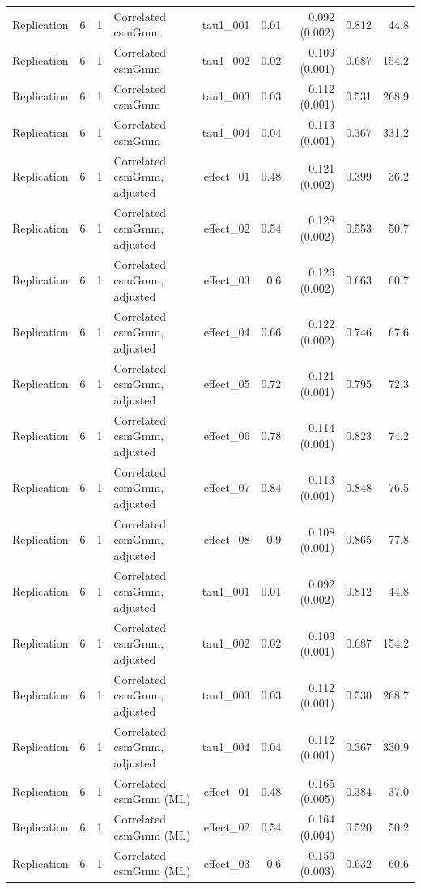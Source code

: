 \begin{longtable}{lcclrrrrr}
Replication & 6 & 1 & Correlated csmGmm & tau1\_001 & 0.01 & 0.092 (0.002) & 0.812 & 44.8\\
Replication & 6 & 1 & Correlated csmGmm & tau1\_002 & 0.02 & 0.109 (0.001) & 0.687 & 154.2\\
Replication & 6 & 1 & Correlated csmGmm & tau1\_003 & 0.03 & 0.112 (0.001) & 0.531 & 268.9\\
Replication & 6 & 1 & Correlated csmGmm & tau1\_004 & 0.04 & 0.113 (0.001) & 0.367 & 331.2\\
Replication & 6 & 1 & Correlated csmGmm, adjusted & effect\_01 & 0.48 & 0.121 (0.002) & 0.399 & 36.2\\
Replication & 6 & 1 & Correlated csmGmm, adjusted & effect\_02 & 0.54 & 0.128 (0.002) & 0.553 & 50.7\\
Replication & 6 & 1 & Correlated csmGmm, adjusted & effect\_03 & 0.6 & 0.126 (0.002) & 0.663 & 60.7\\
Replication & 6 & 1 & Correlated csmGmm, adjusted & effect\_04 & 0.66 & 0.122 (0.002) & 0.746 & 67.6\\
Replication & 6 & 1 & Correlated csmGmm, adjusted & effect\_05 & 0.72 & 0.121 (0.001) & 0.795 & 72.3\\
Replication & 6 & 1 & Correlated csmGmm, adjusted & effect\_06 & 0.78 & 0.114 (0.001) & 0.823 & 74.2\\
Replication & 6 & 1 & Correlated csmGmm, adjusted & effect\_07 & 0.84 & 0.113 (0.001) & 0.848 & 76.5\\
Replication & 6 & 1 & Correlated csmGmm, adjusted & effect\_08 & 0.9 & 0.108 (0.001) & 0.865 & 77.8\\
Replication & 6 & 1 & Correlated csmGmm, adjusted & tau1\_001 & 0.01 & 0.092 (0.002) & 0.812 & 44.8\\
Replication & 6 & 1 & Correlated csmGmm, adjusted & tau1\_002 & 0.02 & 0.109 (0.001) & 0.687 & 154.2\\
Replication & 6 & 1 & Correlated csmGmm, adjusted & tau1\_003 & 0.03 & 0.112 (0.001) & 0.530 & 268.7\\
Replication & 6 & 1 & Correlated csmGmm, adjusted & tau1\_004 & 0.04 & 0.112 (0.001) & 0.367 & 330.9\\
Replication & 6 & 1 & Correlated csmGmm (ML) & effect\_01 & 0.48 & 0.165 (0.005) & 0.384 & 37.0\\
Replication & 6 & 1 & Correlated csmGmm (ML) & effect\_02 & 0.54 & 0.164 (0.004) & 0.520 & 50.2\\
Replication & 6 & 1 & Correlated csmGmm (ML) & effect\_03 & 0.6 & 0.159 (0.003) & 0.632 & 60.6\\

\end{longtable}
